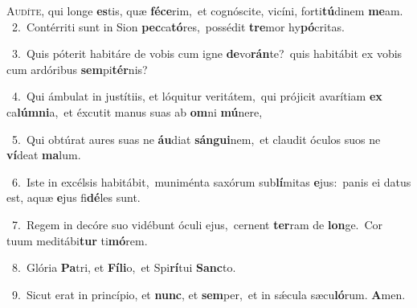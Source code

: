 \lettrine{\initial\textcolor{\initialcolor}{A}}{udíte,} qui longe \textbf{es}\-tis, quæ \textbf{fé}\-\textbf{ce}rim,~\star et cognóscite, vicíni, forti\-\textbf{tú}\-dinem \textbf{me}\-am.\\
{\numbfont\textcolor{\numbcolor}{~2.}}~Contérriti sunt in Sion \textbf{pec}\-ca\-\textbf{tó}\-res,~\star possédit \textbf{tre}\-mor hy\-\textbf{pó}\-critas.\par
{\numbfont\textcolor{\numbcolor}{~3.}}~Quis póterit habitáre de vobis cum igne \textbf{de}\-vo\-\textbf{rán}\-te?~\star quis habitábit ex vobis cum ardóribus \textbf{sem}\-pi\-\textbf{tér}\-nis?\par
{\numbfont\textcolor{\numbcolor}{~4.}}~Qui ámbulat in justítiis, et lóquitur veritátem,~\dagger qui prójicit avarítiam \textbf{ex} ca\-\textbf{lúm}\-\textbf{ni}a,~\star et éxcutit manus suas ab \textbf{om}\-ni \textbf{mú}\-nere,\par
{\numbfont\textcolor{\numbcolor}{~5.}}~Qui obtúrat aures suas ne \textbf{áu}\-diat \textbf{sán}\-\textbf{gui}nem,~\star et claudit óculos suos ne \textbf{ví}\-deat \textbf{ma}\-lum.\par
{\numbfont\textcolor{\numbcolor}{~6.}}~Iste in excélsis habitábit,~\dagger muniménta saxórum sub\-\textbf{lí}\-mitas \textbf{e}\-jus:~\star panis ei datus est, aquæ \textbf{e}\-jus fi\-\textbf{dé}\-les sunt.\par
{\numbfont\textcolor{\numbcolor}{~7.}}~Regem in decóre suo vidébunt óculi ejus,~\dagger cernent \textbf{ter}\-ram de \textbf{lon}\-ge.~\star Cor tuum meditábi\textbf{tur} ti\-\textbf{mó}\-rem.\par
{\numbfont\textcolor{\numbcolor}{~8.}}~Glória \textbf{Pa}\-tri, et \textbf{Fí}\-\textbf{li}o,~\star et Spi\-\textbf{rí}\-tui \textbf{Sanc}\-to.\par
{\numbfont\textcolor{\numbcolor}{~9.}}~Sicut erat in princípio, et \textbf{nunc}\-, et \textbf{sem}\-per,~\star et in sǽcula sæcu\-\textbf{ló}\-rum. \textbf{A}\-men.\par
